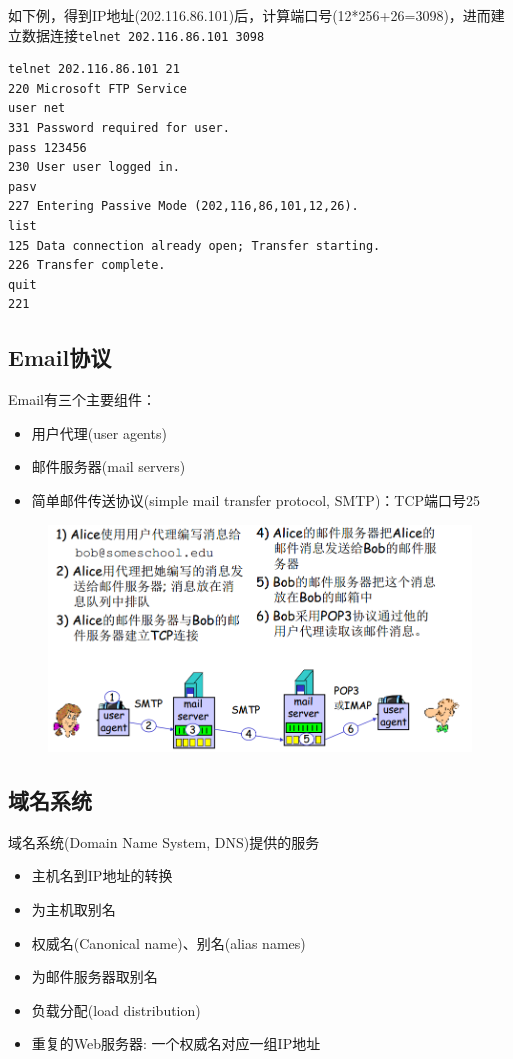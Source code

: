 如下例，得到IP地址(202.116.86.101)后，计算端口号(12*256+26=3098)，进而建立数据连接\verb'telnet 202.116.86.101 3098'
\begin{lstlisting}
telnet 202.116.86.101 21
220 Microsoft FTP Service
user net
331 Password required for user.
pass 123456
230 User user logged in.
pasv
227 Entering Passive Mode (202,116,86,101,12,26).
list
125 Data connection already open; Transfer starting.
226 Transfer complete.
quit
221
\end{lstlisting}

\subsection{Email协议}
Email有三个主要组件：
\begin{itemize}
\item 用户代理(user agents)
\item 邮件服务器(mail servers)
\item 简单邮件传送协议(simple mail transfer protocol, SMTP)：TCP端口号25
\end{itemize}
\begin{figure}[H]
\centering
\includegraphics[width=0.8\linewidth]{fig/SMTP.png}
\end{figure}

\subsection{域名系统}
域名系统(Domain Name System, DNS)提供的服务
\begin{itemize}
\item 主机名到IP地址的转换
\item 为主机取别名
\item 权威名(Canonical name)、别名(alias names)
\item 为邮件服务器取别名
\item  负载分配(load distribution)
\item 重复的Web服务器: 一个权威名对应一组IP地址
\end{itemize}

